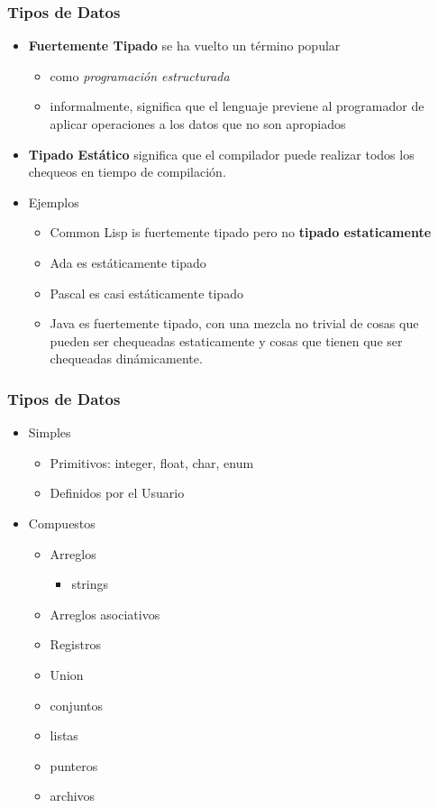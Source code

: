 \documentclass[11pt]{article}
\begin{document}
\subsubsection*{Tipos de Datos}
\label{sec:orgheadline2}
\begin{itemize}
\item \textbf{Fuertemente Tipado} se ha vuelto un término popular
\begin{itemize}
\item como \emph{programación estructurada}
\item informalmente, significa que el lenguaje previene al programador
de aplicar operaciones a los datos que no son apropiados
\end{itemize}
\item \textbf{Tipado Estático} significa que el compilador puede realizar todos
los chequeos en tiempo de compilación.
\item Ejemplos
\begin{itemize}
\item Common Lisp is fuertemente tipado pero no \textbf{tipado estaticamente}
\item Ada es estáticamente tipado
\item Pascal es casi estáticamente tipado
\item Java es fuertemente tipado, con una mezcla no trivial de cosas que
pueden ser chequeadas estaticamente y cosas que tienen que ser
chequeadas dinámicamente.
\end{itemize}
\end{itemize}


\subsubsection*{Tipos de Datos}
\label{sec:orgheadline3}
\begin{itemize}
\item Simples
\begin{itemize}
\item Primitivos: integer, float, char, enum
\item Definidos por el Usuario
\end{itemize}
\item Compuestos
\begin{itemize}
\item Arreglos
\begin{itemize}
\item strings
\end{itemize}
\item Arreglos asociativos
\item Registros
\item Union
\item conjuntos
\item listas
\item punteros
\item archivos
\end{itemize}
\end{itemize}
\end{document}
